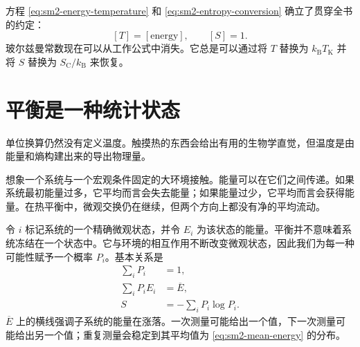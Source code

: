 方程 \eqref{eq:sm2-energy-temperature} 和
\eqref{eq:sm2-entropy-conversion} 确立了贯穿全书的约定：
\[
 [T]=[\text{energy}],
 \qquad
 [S]=1.
\]
玻尔兹曼常数现在可以从工作公式中消失。它总是可以通过将 \(T\) 替换为 \(k_{\mathrm B}T_{\mathrm K}\) 并将 \(S\) 替换为 \(S_{\mathrm C}/k_{\mathrm B}\) 来恢复。

\begin{classroomqa}
\end{classroomqa}

\begin{classroomqa}
\end{classroomqa}

\begin{classroomqa}
\end{classroomqa}

\section{平衡是一种统计状态}

单位换算仍然没有定义温度。触摸热的东西会给出有用的生物学直觉，但温度是由能量和熵构建出来的导出物理量。

想象一个系统与一个宏观条件固定的大环境接触。能量可以在它们之间传递。如果系统最初能量过多，它平均而言会失去能量；如果能量过少，它平均而言会获得能量。在热平衡中，微观交换仍在继续，但两个方向上都没有净的平均流动。

令 \(i\) 标记系统的一个精确微观状态，并令 \(E_i\) 为该状态的能量。平衡并不意味着系统冻结在一个状态中。它与环境的相互作用不断改变微观状态，因此我们为每一种可能性赋予一个概率 \(P_i\)。基本关系是
\begin{align}
 \sum_i P_i &=1,
 \label{eq:sm2-normalization}\\
 \sum_i P_iE_i &=\overline E,
 \label{eq:sm2-mean-energy}\\
 S&=-\sum_iP_i\log P_i.
 \label{eq:sm2-equilibrium-entropy}
\end{align}
\(\overline E\) 上的横线强调子系统的能量在涨落。一次测量可能给出一个值，下一次测量可能给出另一个值；重复测量会稳定到其平均值为 \eqref{eq:sm2-mean-energy} 的分布。

